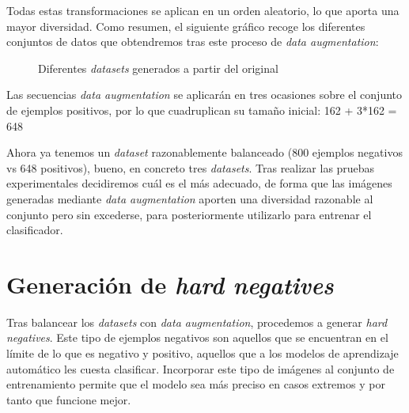 Todas estas transformaciones se aplican en un orden aleatorio, lo que aporta una mayor diversidad. Como resumen, el siguiente gráfico recoge los diferentes conjuntos de datos que obtendremos tras este proceso de \textit{data augmentation}:
\begin{figure}[H]
\centering
    \caption{Diferentes \textit{datasets} generados a partir del original} 
\end{figure}

Las secuencias \textit{data augmentation} se aplicarán en tres ocasiones sobre el conjunto de ejemplos positivos, por lo que cuadruplican su tamaño inicial: 162 + 3*162 = 648

Ahora ya tenemos un \textit{dataset} razonablemente balanceado (800 ejemplos negativos vs 648 positivos), bueno, en concreto tres \textit{datasets}. Tras realizar las pruebas experimentales decidiremos cuál es el más adecuado, de forma que las imágenes generadas mediante \textit{data augmentation} aporten una diversidad razonable al conjunto pero sin excederse, para posteriormente utilizarlo para entrenar el clasificador.

\newpage
\section{Generación de \textit{hard negatives}}
Tras balancear los \textit{datasets} con \textit{data augmentation}, procedemos a generar \textit{hard negatives}. Este tipo de ejemplos negativos son aquellos que se encuentran en el límite de lo que es negativo y positivo, aquellos que a los modelos de aprendizaje automático les cuesta clasificar. Incorporar este tipo de imágenes al conjunto de entrenamiento permite que el modelo sea más preciso en casos extremos y por tanto que funcione mejor.

